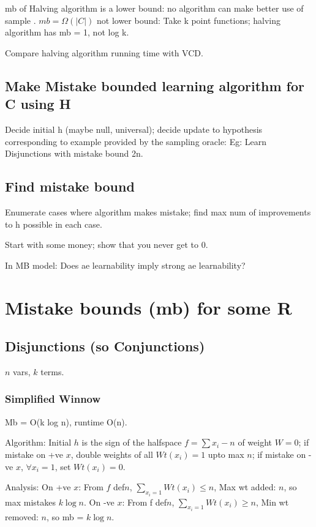 \documentclass[oneside, article]{memoir}
\begin{document}
mb of Halving algorithm is a lower bound: no algorithm can make better use of sample \chk. $mb = \Omega(|C|)$ not lower bound: Take k point functions; halving algorithm has mb = 1, not log k.

\oprob Compare halving algorithm running time with VCD.

\subsection{Make Mistake bounded learning algorithm for C using H}
Decide initial h (maybe null, universal); decide update to hypothesis corresponding to example provided by the sampling oracle: Eg: Learn Disjunctions with mistake bound 2n.

\subsection{Find mistake bound}
Enumerate cases where algorithm makes mistake; find max num of improvements to h possible in each case.

Start with some money; show that you never get to 0.

\oprob In MB model: Does ae learnability imply strong ae learnability?

\section{Mistake bounds (mb) for some R}

\subsection{Disjunctions (so Conjunctions)}
$n$ vars, $k$ terms.

\subsubsection{Simplified Winnow}
Mb = O(k log n), runtime O(n).

Algorithm: Initial $h$ is the sign of the halfspace $f = \sum x_{i} -n$ of weight $W=0$; if mistake on +ve $x$, double weights of all $Wt(x_{i}) = 1$ upto max $n$; if mistake on -ve $x$, $\forall x_{i}=1$, set $Wt(x_{i}) = 0$.

Analysis: On +ve $x$: From $f$ def$n$, $\sum_{x_{i}=1} Wt(x_{i}) \leq n$, Max wt added: $n$, so max mistakes $k \log n$. On -ve $x$: From f def$n$, $\sum_{x_{i}=1}Wt(x_{i}) \geq n$, Min wt removed: $n$, so mb = $k \log n$.
\end{document}
